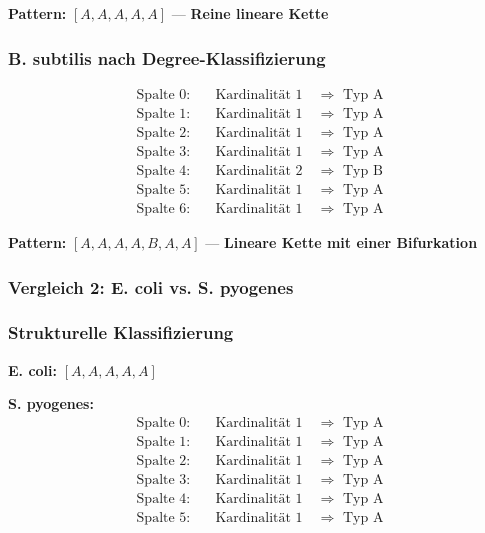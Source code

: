 \documentclass[a4paper,12pt]{article}
\theoremstyle{definition}
\begin{document}
\textbf{Pattern:} $[A, A, A, A, A]$ — \textbf{Reine lineare Kette}

\subsubsection*{B. subtilis nach Degree-Klassifizierung}

\begin{align*}
\text{Spalte 0:} &\quad \text{Kardinalität } 1 \quad \Rightarrow \text{ Typ A} \\
\text{Spalte 1:} &\quad \text{Kardinalität } 1 \quad \Rightarrow \text{ Typ A} \\
\text{Spalte 2:} &\quad \text{Kardinalität } 1 \quad \Rightarrow \text{ Typ A} \\
\text{Spalte 3:} &\quad \text{Kardinalität } 1 \quad \Rightarrow \text{ Typ A} \\
\text{Spalte 4:} &\quad \text{Kardinalität } 2 \quad \Rightarrow \text{ Typ B} \\
\text{Spalte 5:} &\quad \text{Kardinalität } 1 \quad \Rightarrow \text{ Typ A} \\
\text{Spalte 6:} &\quad \text{Kardinalität } 1 \quad \Rightarrow \text{ Typ A}
\end{align*}

\textbf{Pattern:} $[A, A, A, A, B, A, A]$ — \textbf{Lineare Kette mit einer Bifurkation}


\subsubsection*{Vergleich 2: E. coli vs. S. pyogenes}

\subsubsection{Strukturelle Klassifizierung}

\textbf{E. coli:} $[A, A, A, A, A]$

\textbf{S. pyogenes:}
\begin{align*}
\text{Spalte 0:} &\quad \text{Kardinalität } 1 \quad \Rightarrow \text{ Typ A} \\
\text{Spalte 1:} &\quad \text{Kardinalität } 1 \quad \Rightarrow \text{ Typ A} \\
\text{Spalte 2:} &\quad \text{Kardinalität } 1 \quad \Rightarrow \text{ Typ A} \\
\text{Spalte 3:} &\quad \text{Kardinalität } 1 \quad \Rightarrow \text{ Typ A} \\
\text{Spalte 4:} &\quad \text{Kardinalität } 1 \quad \Rightarrow \text{ Typ A} \\
\text{Spalte 5:} &\quad \text{Kardinalität } 1 \quad \Rightarrow \text{ Typ A}
\end{align*}
\end{document}
